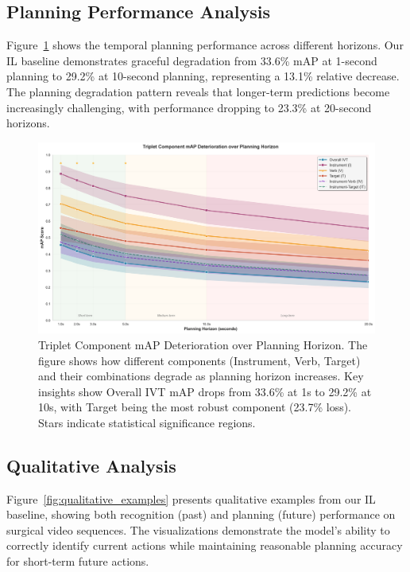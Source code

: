 \documentclass[runningheads]{llncs}
\begin{document}
\subsection{Planning Performance Analysis}

Figure~\ref{fig:planning_analysis} shows the temporal planning performance across different horizons. Our IL baseline demonstrates graceful degradation from 33.6\% mAP at 1-second planning to 29.2\% at 10-second planning, representing a 13.1\% relative decrease. The planning degradation pattern reveals that longer-term predictions become increasingly challenging, with performance dropping to 23.3\% at 20-second horizons.

\begin{figure}[h]
\centering
\includegraphics[width=\textwidth]{planning_analysis_simple.png}
\caption{Triplet Component mAP Deterioration over Planning Horizon. The figure shows how different components (Instrument, Verb, Target) and their combinations degrade as planning horizon increases. Key insights show Overall IVT mAP drops from 33.6\% at 1s to 29.2\% at 10s, with Target being the most robust component (23.7\% loss). Stars indicate statistical significance regions.}
\label{fig:planning_analysis}
\end{figure}

\subsection{Qualitative Analysis}

Figure~\ref{fig:qualitative_examples} presents qualitative examples from our IL baseline, showing both recognition (past) and planning (future) performance on surgical video sequences. The visualizations demonstrate the model's ability to correctly identify current actions while maintaining reasonable planning accuracy for short-term future actions.
\end{document}

